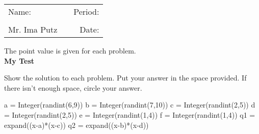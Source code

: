 \documentclass[a4paper,addpoints,12point]{exam}%
\newcommand{\assignment}{My Test}
\newcommand{\teacher}{Mr. Ima Putz}
\begin{document}
\fontsize{17pt}{20pt}\selectfont %
\noindent
\begin{tabular}{@{}l p{1.6in}r @{}}
Name: \vrule height 0 pt depth 0.4 pt width 3.0 in & & Period: \vrule height 0 pt depth 0.4 pt width .75 in \\\\
\teacher &  &Date: \hrulefill \\
\end{tabular}
\begin{center}
The point value is given for each problem.\\ \vspace{.1in}
	{\bf \assignment}
\end{center}
\noindent Show the solution to each problem. Put your answer in the space provided. If there isn't enough space, circle your answer.
\begin{sagesilent}
a = Integer(randint(6,9))
b = Integer(randint(7,10))
c = Integer(randint(2,5))
d = Integer(randint(2,5))
e = Integer(randint(1,4))
f = Integer(randint(1,4))
q1 = expand((x-a)*(x-c))
q2 = expand((x-b)*(x-d))
\end{sagesilent}
\end{document}
